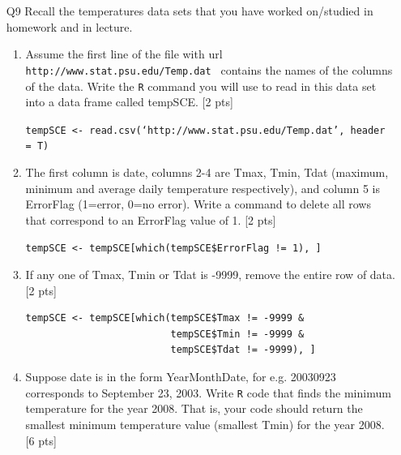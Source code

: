 \documentclass[12pt]{article}
\theoremstyle{Conjecture}
\theoremstyle{example}
\theoremstyle{remark}
\theoremstyle{lemma}
\theoremstyle{definition}
\theoremstyle{corol}
\theoremstyle{proposition}
\theoremstyle{condition}
\begin{document}
\begin{enumerate}
\begin{enumerate}
\begin{enumerate}
\item \verb| aList$x[2:4] |

{\color{blue}\tt [1] "b" "c" "d"}
\item \verb| aList$mat + aList$one + 3|

{\color{blue}\tt 
\begin{verbatim}
     [,1] [,2]
[1,]  111  108
[2,]  110  107
[3,]  109  106
\end{verbatim}}
\item \verb| sapply(aList$zz, sum)|

{\color{blue}\tt
\begin{verbatim}
 x  y  z 
 6 45  3 
\end{verbatim}}
\item \verb| length(aList[["zz"]][[1]])|

{\color{blue}\tt [1] 3}
\end{enumerate}
\end{enumerate}

\newpage 
\item [Q9] Recall the temperatures data sets that you have worked on/studied in homework and in lecture. 
\begin{enumerate}
\item Assume the first line of the file with url
  \verb| http://www.stat.psu.edu/Temp.dat | contains the names of the
  columns of the data. Write the {\tt R} command you will use to read
  in this data set into a data frame called tempSCE. [2 pts]

  {\color{blue}\tt tempSCE <- read.csv(`http://www.stat.psu.edu/Temp.dat', header = T)}
\item The first column is date, columns 2-4 are Tmax, Tmin, Tdat
  (maximum, minimum and average daily temperature respectively), and
  column 5 is ErrorFlag (1=error, 0=no error). Write a command to
  delete all rows that correspond to an ErrorFlag value of 1. [2 pts]

  {\color{blue}\tt tempSCE <- tempSCE[which(tempSCE\$ErrorFlag != 1), ]}
\item If any one of Tmax, Tmin or Tdat is -9999, remove the entire row of data. [2 pts]

  {\color{blue}
  \begin{verbatim}
tempSCE <- tempSCE[which(tempSCE$Tmax != -9999 &
                         tempSCE$Tmin != -9999 &
                         tempSCE$Tdat != -9999), ]
  \end{verbatim}
}
\item Suppose date is in the form YearMonthDate, for e.g. 20030923
  corresponds to September 23, 2003. Write {\tt R} code that finds the
  minimum temperature for the year 2008. That is, your code should
  return the smallest minimum temperature value (smallest Tmin) for
  the year 2008. [6 pts]


\end{enumerate}
\end{enumerate}
\end{document}

